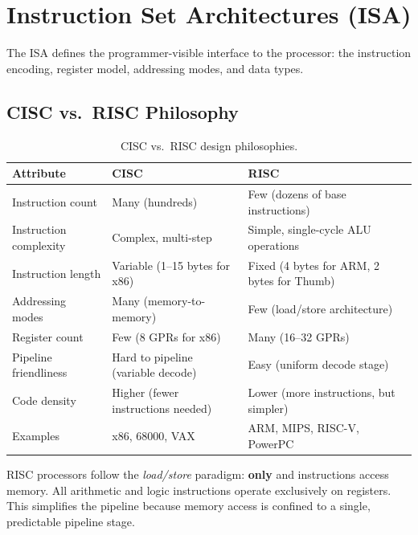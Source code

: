 \section{Instruction Set Architectures (ISA)}
\label{sec:arch:isa}

The ISA defines the programmer-visible interface to the processor: the instruction encoding, register model, addressing modes, and data types.

\subsection{CISC vs.\ RISC Philosophy}

\begin{table}[H]
\centering
\caption{CISC vs.\ RISC design philosophies.}
\label{tab:arch:ciscrisc}
\begin{tabularx}{\textwidth}{l X X}
\toprule
\textbf{Attribute} & \textbf{CISC} & \textbf{RISC} \\
\midrule
Instruction count & Many (hundreds) & Few (dozens of base instructions) \\
Instruction complexity & Complex, multi-step & Simple, single-cycle ALU operations \\
Instruction length & Variable (1--15 bytes for x86) & Fixed (4 bytes for ARM, 2 bytes for Thumb) \\
Addressing modes & Many (memory-to-memory) & Few (load/store architecture) \\
Register count & Few (8 GPRs for x86) & Many (16--32 GPRs) \\
Pipeline friendliness & Hard to pipeline (variable decode) & Easy (uniform decode stage) \\
Code density & Higher (fewer instructions needed) & Lower (more instructions, but simpler) \\
Examples & x86, 68000, VAX & ARM, MIPS, RISC-V, PowerPC \\
\bottomrule
\end{tabularx}
\end{table}

\begin{important}
RISC processors follow the \emph{load/store} paradigm: \textbf{only}  and  instructions access memory. All arithmetic and logic instructions operate exclusively on registers. This simplifies the pipeline because memory access is confined to a single, predictable pipeline stage.
\end{important}

